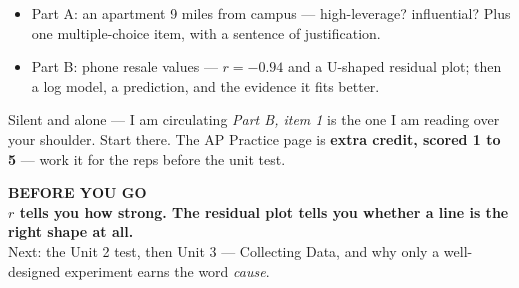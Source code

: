 \documentclass[aspectratio=169, 11pt]{beamer}
\begin{document}
\begin{frame}[t, plain]
  \begin{itemize}\setlength{\itemsep}{5pt}
    \item Part A: an apartment 9 miles from campus --- high-leverage? influential? Plus one
          multiple-choice item, with a sentence of justification.
    \item Part B: phone resale values --- $r = -0.94$ and a U-shaped residual plot; then a log
          model, a prediction, and the evidence it fits better.
  \end{itemize}
  \begin{block}{Silent and alone --- I am circulating}
    \emph{Part B, item 1} is the one I am reading over your shoulder. Start there. The AP
    Practice page is \textbf{extra credit, scored 1 to 5} --- work it for the reps before the unit test.
  \end{block}
\end{frame}

{
\begin{frame}[plain]
  \vspace{1.5cm}\hspace{0.8cm}%
  \begin{minipage}{0.86\textwidth}
    {\color{goldacc}\bfseries\small BEFORE YOU GO}\\[0.7cm]
    {\color{white}\bfseries\Large $r$ tells you how strong. The residual plot tells you whether
    a line is the right shape at all.}\\[0.9cm]
    {\color{skymid}\small Next: the Unit 2 test, then Unit 3 --- Collecting Data, and why only a
    well-designed experiment earns the word \emph{cause}.}
  \end{minipage}
\end{frame}
}
\end{document}

